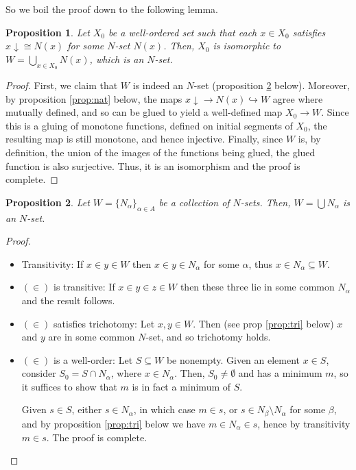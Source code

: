 \documentclass{article}
\newtheorem{prop}{Proposition}
\theoremstyle{nonumberplain}
\newtheorem{proof}{Proof}
\newcommand{\below}[1]{{#1\!\!\downarrow}}
\begin{document}
So we boil the proof down to the following lemma.

\begin{prop}
Let $X_0$ be a well-ordered set such that each $x \in X_0$ satisfies $\below x \cong N(x)$ for some $N$-set $N(x)$. Then, $X_0$ is isomorphic to $W = \bigcup_{x \in X_0} N(x)$, which is an $N$-set.
\end{prop}

\begin{proof}
First, we claim that $W$ is indeed an $N$-set (proposition \ref{prop:w} below). Moreover, by proposition \ref{prop:nat} below, the maps $\below x \to N(x) \hookrightarrow W$ agree where mutually defined, and so can be glued to yield a well-defined map $X_0 \to W$. Since this is a gluing of monotone functions, defined on initial segments of $X_0$, the resulting map is still monotone, and hence injective. Finally, since $W$ is, by definition, the union of the images of the functions being glued, the glued function is also surjective. Thus, it is an isomorphism and the proof is complete.
\end{proof}

\begin{prop}\label{prop:w}
Let $W = \{N_\alpha\}_{\alpha \in A}$ be a collection of $N$-sets. Then, $W = \bigcup N_\alpha$ is an $N$-set.
\end{prop}

\begin{proof}
\leavevmode
\begin{itemize}
\item Transitivity: If $x \in y \in W$ then $x \in y \in N_\alpha$ for some $\alpha$, thus $x \in N_\alpha \subseteq W$.
\item $(\in)$ is transitive: If $x \in y \in z \in W$ then these three lie in some common $N_\alpha$ and the result follows.
\item $(\in)$ satisfies trichotomy: Let $x, y \in W$. Then (see prop \ref{prop:tri} below) $x$ and $y$ are in some common $N$-set, and so trichotomy holds.
\item $(\in)$ is a well-order: Let $S \subseteq W$ be nonempty. Given an element $x \in S$, consider $S_0 = S \cap N_\alpha$, where $x \in N_\alpha$. Then, $S_0 \neq \emptyset$ and has a minimum $m$, so it suffices to show that $m$ is in fact a minimum of $S$.

Given $s \in S$, either $s \in N_\alpha$, in which case $m \in s$, or $s \in N_\beta \setminus N_\alpha$ for some $\beta$, and by proposition \ref{prop:tri} below we have $m \in N_\alpha \in s$, hence by transitivity $m \in s$. The proof is complete.
\end{itemize}
\end{proof}
\end{document}
